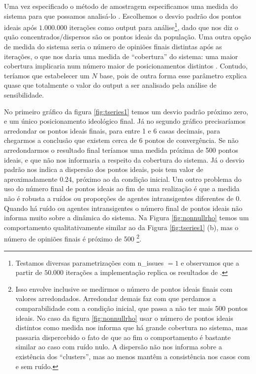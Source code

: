     Uma vez especificado o método de amostragem especificamos uma medida do
    sistema para que possamos analisá-lo \cite{railsback2012agent}. Escolhemos o
    desvio padrão dos pontos ideais após \(1.000.000\) iterações como output
    para análise\footnote{Testamos diversas parametrizações com n\_issues \(=
      1\) e observamos que a partir de \(50.000\) iterações a implementação
      replica os resultados de .}, dado que nos
    diz o quão concentrados/dispersos são os pontos ideais da população. Uma
    outra opção de medida do sistema seria o número de opiniões finais distintas
    após as iterações, o que nos daria uma medida de ``cobertura'' do sistema:
    uma maior cobertura implicaria num número maior de posicionamentos distintos
    \cite{bramson2016disambiguation}. Contudo, teríamos que estabelecer um \(N\)
    base, pois de outra forma esse parâmetro explica quase que totalmente o
    valor do output a ser analisado pela análise de sensibilidade.

    No primeiro gráfico da figura \ref{fig:tseries1} temos um desvio padrão
    próximo zero, e um único posicionamento ideológico final. Já no segundo
    gráfico precisaríamos arredondar os pontos ideais finais, para entre 1 e 6
    casas decimais, para chegarmos a conclusão que existem cerca de 6 pontos de
    convergência. Se não arredondarmos o resultado final teríamos uma medida
    próxima de 500 pontos ideais, e que não nos informaria a respeito da
    cobertura do sistema. Já o desvio padrão nos indica a dispersão dos pontos
    ideais, pois tem valor de aproximadamente 0.24, próximo ao da condição
    inicial. Um outro problema do uso do número final de pontos ideais ao fim de
    uma realização é que a medida não é robusta a ruídos ou proporções de
    agentes intransigentes diferentes de 0. Quando há ruído ou agentes
    intransigentes o número final de pontos ideais não informa muito sobre a
    dinâmica do sistema. Na Figura \ref{fig:nonnullrho} temos um comportamento
    qualitativamente similar ao da Figura \ref{fig:tseries1} (b), mas o número
    de opiniões finais é próximo de 500 \footnote{Isso envolve inclusive se
      medirmos o número de pontos ideais finais com valores arredondados.
      Arredondar demais faz com que perdamos a comparabilidade com a condição
      inicial, que passa a não ter mais 500 pontos ideais. No caso da figura
      \ref{fig:nonnullrho} usar o número de pontos ideais distintos como medida
      nos informa que há grande cobertura no sistema, mas passaria dispercebido
      o fato de que ao fim o comportamento é bastante similar ao caso com ruído
      nulo. A dispersão não nos informa sobre a existência dos ``clusters'', mas
      ao menos mantêm a consistência nos casos com e sem ruído.}.
    
